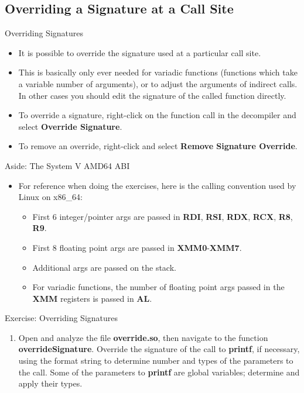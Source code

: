 \documentclass{beamer}
\begin{document}
\subsection{Overriding a Signature at a Call Site}
\begin{frame}
\begin{block}{Overriding Signatures}
\begin{itemize}
\item It is possible to override the signature used at a particular call site.
\item This is basically only ever needed for variadic functions (functions which take a variable number of arguments), or to adjust the arguments of indirect calls.
In other cases you should edit the signature of the called function directly.
\item To override a signature, right-click on the function call in the decompiler and select \textbf{Override Signature}.
\item To remove an override, right-click and select \textbf{Remove Signature Override}.
\end{itemize}
\end{block}
\end{frame}

\begin{frame}
\begin{block}{Aside: The System V AMD64 ABI}
\begin{itemize}
\item For reference when doing the exercises, here is the calling convention used by Linux on x86\_64:
\begin{itemize}
\item First 6 integer/pointer args are passed in \textbf{RDI}, \textbf{RSI}, \textbf{RDX}, \textbf{RCX}, \textbf{R8}, \textbf{R9}.
\item First 8 floating point args are passed in \textbf{XMM0}-\textbf{XMM7}. 
\item Additional args are passed on the stack.
\item For variadic functions, the number of floating point args passed in the \textbf{XMM} registers is passed in \textbf{AL}.
\end{itemize}
\end{itemize}
\end{block}
\end{frame}

\begin{frame}
\begin{block}{Exercise: Overriding Signatures}
\begin{enumerate}
\item Open and analyze the file \textbf{override.so}, then navigate to the function \textbf{overrideSignature}.  Override the signature of the call 
to \textbf{printf}, if necessary, using the format string to determine number and types of the parameters to the call. Some of the parameters to 
\textbf{printf} are global variables; determine and apply their types. 
\end{enumerate}
\end{block}
\end{frame}
\end{document}
